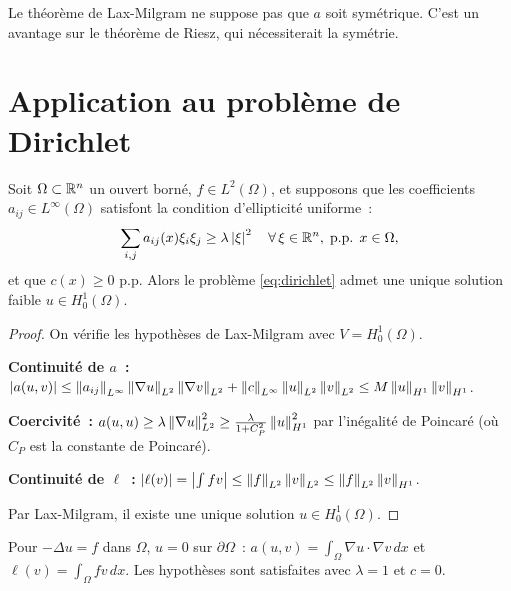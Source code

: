 \begin{attention}[title=\textbf{Sym\'etrie non requise}]
Le th\'eor\`eme de Lax-Milgram ne suppose pas que $a$ soit sym\'etrique. C'est un
avantage sur le th\'eor\`eme de Riesz, qui n\'ecessiterait la sym\'etrie.
\end{attention}

\section{Application au probl\`eme de Dirichlet}

\begin{theoreme}
\label{thm:dirichlet}
Soit $\Omega \subset \mathbb{R}^n$ un ouvert born\'e, $f \in L^2(\Omega)$, et supposons
que les coefficients $a_{ij} \in L^\infty(\Omega)$ satisfont la condition
d'ellipticit\'e uniforme~:
\[
    \sum_{i,j} a_{ij}(x) \xi_i \xi_j \geq \lambda \left| \xi \right|^2
    \quad \forall\, \xi \in \mathbb{R}^n,\; \text{p.p. } x \in \Omega,
\]
et que $c(x) \geq 0$ p.p. Alors le probl\`eme \eqref{eq:dirichlet} admet une unique
solution faible $u \in H_0^1(\Omega)$.
\end{theoreme}

\begin{proof}
On v\'erifie les hypoth\`eses de Lax-Milgram avec $V = H_0^1(\Omega)$.

\textbf{Continuit\'e de $a$~:}
$\left| a(u,v) \right| \leq \left\| a_{ij} \right\|_{L^\infty} \left\| \nabla u \right\|_{L^2} \left\| \nabla v \right\|_{L^2}
+ \left\| c \right\|_{L^\infty} \left\| u \right\|_{L^2} \left\| v \right\|_{L^2} \leq M \left\| u \right\|_{H^1} \left\| v \right\|_{H^1}$.

\textbf{Coercivit\'e~:}
$a(u,u) \geq \lambda \left\| \nabla u \right\|_{L^2}^2 \geq \frac{\lambda}{1 + C_P^2} \left\| u \right\|_{H^1}^2$
par l'in\'egalit\'e de Poincar\'e (o\`u $C_P$ est la constante de Poincar\'e).

\textbf{Continuit\'e de $\ell$~:}
$\left| \ell(v) \right| = \left| \int f v \right| \leq \left\| f \right\|_{L^2}\left\| v \right\|_{L^2}
\leq \left\| f \right\|_{L^2}\left\| v \right\|_{H^1}$.

Par Lax-Milgram, il existe une unique solution $u \in H_0^1(\Omega)$.
\end{proof}

\begin{exemple}
Pour $-\Delta u = f$ dans $\Omega$, $u = 0$ sur $\partial\Omega$~:
$a(u,v) = \int_\Omega \nabla u \cdot \nabla v\, dx$ et $\ell(v) = \int_\Omega fv\, dx$.
Les hypoth\`eses sont satisfaites avec $\lambda = 1$ et $c = 0$.
\end{exemple}

